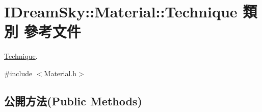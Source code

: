 \hypertarget{class_i_dream_sky_1_1_material_1_1_technique}{}\section{I\+Dream\+Sky\+:\+:Material\+:\+:Technique 類別 參考文件}
\label{class_i_dream_sky_1_1_material_1_1_technique}


\hyperlink{class_i_dream_sky_1_1_material_1_1_technique}{Technique}.  




{\ttfamily \#include $<$Material.\+h$>$}

\subsection*{公開方法(Public Methods)}
